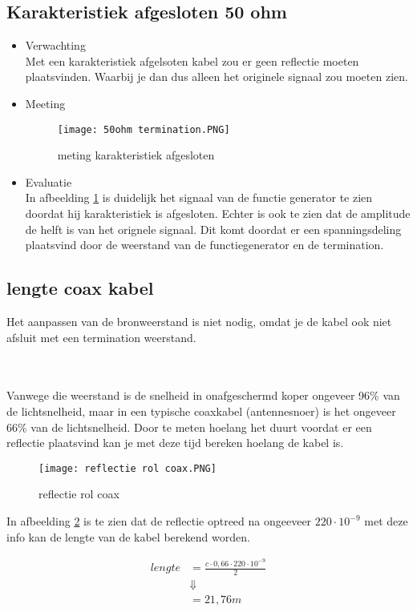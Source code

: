 \subsection{Karakteristiek afgesloten 50 ohm}
\begin{itemize}
    \item Verwachting\\
    Met een karakteristiek afgelsoten kabel zou er geen reflectie moeten plaatsvinden. Waarbij je dan dus alleen het originele signaal zou moeten zien.
    \item Meeting
    \begin{figure}[H]
        \centering
        \texttt{[image: 50ohm termination.PNG]}
        \caption{meting karakteristiek afgesloten}
        \label{fig:meting karakteristiek afgesloten}
    \end{figure}
    \item Evaluatie\\
    In afbeelding \ref{fig:meting karakteristiek afgesloten} is duidelijk het signaal van de functie generator te zien doordat hij karakteristiek is afgesloten. Echter is ook te zien dat de amplitude de helft is van het orignele signaal. Dit komt doordat er een spanningsdeling plaatsvind door de weerstand van de functiegenerator en de termination.
\end{itemize}

\subsection{lengte coax kabel}
Het aanpassen van de bronweerstand is niet nodig, omdat je de kabel ook niet afsluit met een termination weerstand.

\hspace{1cm}\\
\\
Vanwege die weerstand is de snelheid in onafgeschermd koper ongeveer 96\% van de lichtsnelheid, maar in een typische coaxkabel (antennesnoer) is het ongeveer 66\% van de lichtsnelheid. 
Door te meten hoelang het duurt voordat er een reflectie plaatsvind kan je met deze tijd bereken hoelang de kabel is.

\begin{figure}[H]
    \centering
    \texttt{[image: reflectie rol coax.PNG]}
    \caption{reflectie rol coax}
    \label{fig:reflectie rol coax}
\end{figure}

In afbeelding \ref{fig:reflectie rol coax} is te zien dat de reflectie optreed na ongeeveer $220\cdot10^{-9}$ met deze info kan de lengte van de kabel berekend worden.

\begin{equation}
    \begin{split}
        lengte &= \frac{c \cdot 0,66 \cdot 220\cdot10^{-9}}{2}\\
        &\Downarrow \\
         &= 21,76m
    \end{split}
\end{equation}